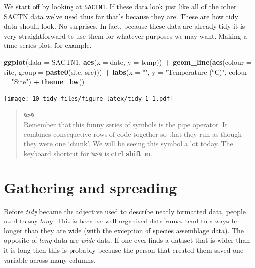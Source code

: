\documentclass[]{book}
\newenvironment{Shaded}{\begin{snugshade}}{\end{snugshade}}
\newcommand{\KeywordTok}[1]{\textcolor[rgb]{0.13,0.29,0.53}{\textbf{#1}}}
\newcommand{\DataTypeTok}[1]{\textcolor[rgb]{0.13,0.29,0.53}{#1}}
\newcommand{\StringTok}[1]{\textcolor[rgb]{0.31,0.60,0.02}{#1}}
\newcommand{\OperatorTok}[1]{\textcolor[rgb]{0.81,0.36,0.00}{\textbf{#1}}}
\newcommand{\NormalTok}[1]{#1}
\theoremstyle{definition}
\theoremstyle{definition}
\theoremstyle{definition}
\theoremstyle{remark}
\begin{document}
We start off by looking at \texttt{SACTN1}. If these data look just like
all of the other SACTN data we've used thus far that's because they are.
These are how tidy data should look. No surprises. In fact, because
these data are already tidy it is very straightforward to use them for
whatever purposes we may want. Making a time series plot, for example.

\begin{Shaded}
\begin{Highlighting}[]
\KeywordTok{ggplot}\NormalTok{(}\DataTypeTok{data =}\NormalTok{ SACTN1, }\KeywordTok{aes}\NormalTok{(}\DataTypeTok{x =}\NormalTok{ date, }\DataTypeTok{y =}\NormalTok{ temp)) }\OperatorTok{+}
\StringTok{  }\KeywordTok{geom_line}\NormalTok{(}\KeywordTok{aes}\NormalTok{(}\DataTypeTok{colour =}\NormalTok{ site, }\DataTypeTok{group =} \KeywordTok{paste0}\NormalTok{(site, src))) }\OperatorTok{+}
\StringTok{  }\KeywordTok{labs}\NormalTok{(}\DataTypeTok{x =} \StringTok{""}\NormalTok{, }\DataTypeTok{y =} \StringTok{"Temperature (°C)"}\NormalTok{, }\DataTypeTok{colour =} \StringTok{"Site"}\NormalTok{) }\OperatorTok{+}
\StringTok{  }\KeywordTok{theme_bw}\NormalTok{()}
\end{Highlighting}
\end{Shaded}

\texttt{[image: 10-tidy\_files/figure-latex/tidy-1-1.pdf]}

\begin{quote}
\textbf{\texttt{\%\textgreater{}\%}}\\
Remember that this funny series of symbols is the pipe operator. It
combines consequetive rows of code together so that they run as though
they were one `chunk'. We will be seeing this symbol a lot today. The
keyboard shortcut for \texttt{\%\textgreater{}\%} is \textbf{ctrl shift
m}.
\end{quote}

\section{Gathering and spreading}\label{gathering-and-spreading}

Before \emph{tidy} became the adjective used to describe neatly
formatted data, people used to say \emph{long}. This is because well
organised dataframes tend to always be longer than they are wide (with
the exception of species assemblage data). The opposite of \emph{long}
data are \emph{wide} data. If one ever finds a dataset that is wider
than it is long then this is probably because the person that created
them saved one variable across many columns.
\end{document}
